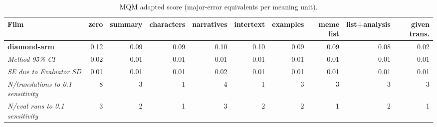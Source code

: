 \begin{table}[ht]
\centering
\begin{adjustbox}{width=\textwidth}
\begin{tabular}{lrrrrrrrr|r}
Film & zero & summary & characters & narratives & intertext & examples & meme list & list+analysis & given trans. \\
\hline
\textbf{diamond-arm} & 0.12 & 0.09 & 0.09 & 0.10 & 0.10 & 0.09 & 0.09 & 0.08 & 0.02 \\

\emph{Method 95\% CI} & 0.02 & 0.01 & 0.01 & 0.01 & 0.01 & 0.01 & 0.01 & 0.01 & 0.01 \\

\emph{SE due to Evaluator SD} & 0.01 & 0.01 & 0.01 & 0.02 & 0.01 & 0.01 & 0.01 & 0.01 & 0.01 \\

\emph{N/translations to 0.1 sensitivity} & 8 & 3 & 1 & 4 & 1 & 3 & 3 & 3 & 3 \\

\emph{N/eval runs to 0.1 sensitivity} & 3 & 2 & 1 & 3 & 2 & 2 & 1 & 2 & 1 \\

\hline
\end{tabular}
\end{adjustbox}
\caption{MQM adapted score (major-error equivalents per meaning unit).}
\label{tab:mqm-method-comparison}
\end{table}
